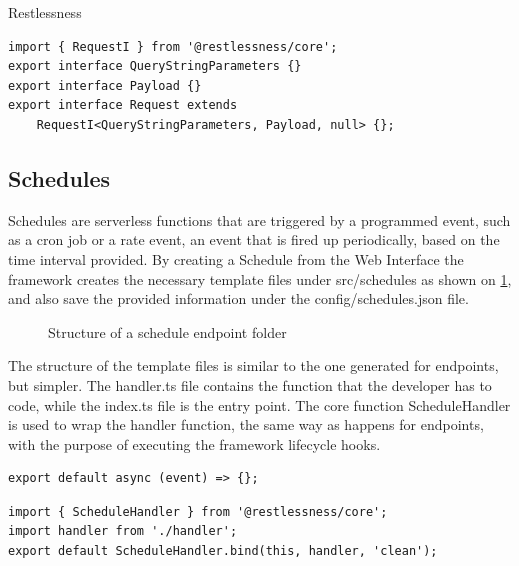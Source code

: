 \begin{chapter}{Restlessness}
    \begin{lstlisting}[caption=interfaces.ts content, label={lst:interfaces_ts}]
import { RequestI } from '@restlessness/core';
export interface QueryStringParameters {}
export interface Payload {}
export interface Request extends
    RequestI<QueryStringParameters, Payload, null> {};
    \end{lstlisting}

    \subsection{Schedules}
    \label{subsec:schedules}
    Schedules are serverless functions that are triggered by a programmed event,
    such as a cron job or a rate event, an event that is fired up periodically,
    based on the time interval provided.
    By creating a Schedule from the Web Interface the framework creates the necessary
    template files under src/schedules as shown on \ref{fig:new_schedule_folder_structure},
    and also save the provided information under the config/schedules.json file.

    \begin{figure}
        \caption{Structure of a schedule endpoint folder}
        \label{fig:new_schedule_folder_structure}
        \begin{minipage}{\linewidth}
        \end{minipage}
    \end{figure}

    The structure of the template files is similar to the one generated for endpoints,
    but simpler. The handler.ts file contains the function that the developer has
    to code, while the index.ts file is the entry point.
    The core function ScheduleHandler is used to wrap the handler function, the same
    way as happens for endpoints, with the purpose of executing the framework lifecycle
    hooks.

    \begin{lstlisting}[caption=handler.ts content, label={lst:sched_handler_ts}]
export default async (event) => {};
    \end{lstlisting}

    \begin{lstlisting}[caption=index.ts content, label={lst:sched_index_ts}]
import { ScheduleHandler } from '@restlessness/core';
import handler from './handler';
export default ScheduleHandler.bind(this, handler, 'clean');
    \end{lstlisting}


\end{chapter}
